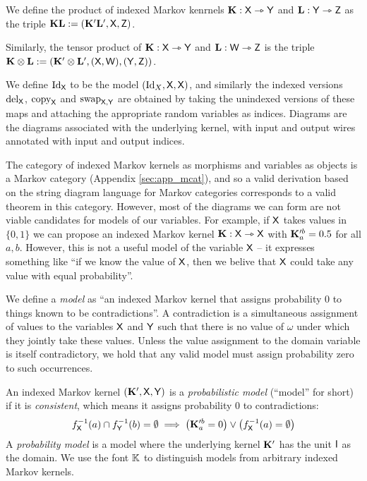 We define the product of indexed Markov kenrnels $\mathbf{K}:\mathsf{X}\rightarrowtriangle \mathsf{Y}$ and $\mathbf{L}:\mathsf{Y}\rightarrowtriangle \mathsf{Z}$ as the triple $\mathbf{K}\mathbf{L}:=(\mathbf{K}'\mathbf{L}',\mathsf{X},\mathsf{Z})$.

Similarly, the tensor product of $\mathbf{K}:\mathsf{X}\rightarrowtriangle\mathsf{Y}$ and $\mathbf{L}:\mathsf{W}\rightarrowtriangle\mathsf{Z}$ is the triple $\mathbf{K}\otimes\mathbf{L}:=(\mathbf{K}'\otimes\mathbf{L}',(\mathsf{X},\mathsf{W}),(\mathsf{Y},\mathsf{Z}))$.

We define $\text{Id}_{\mathsf{X}}$ to be the model $(\text{Id}_X,\mathsf{X},\mathsf{X})$, and similarly the indexed versions $\text{del}_{\mathsf{X}}$, $\text{copy}_{\mathsf{X}}$ and $\text{swap}_{\mathsf{X},\mathsf{Y}}$ are obtained by taking the unindexed versions of these maps and attaching the appropriate random variables as indices. Diagrams are the diagrams associated with the underlying kernel, with input and output wires annotated with input and output indices.

The category of indexed Markov kernels as morphisms and variables as objects is a Markov category (Appendix \ref{sec:app_mcat}), and so a valid derivation based on the string diagram language for Markov categories corresponds to a valid theorem in this category. However, most of the diagrams we can form are not viable candidates for models of our variables. For example, if $\mathsf{X}$ takes values in $\{0,1\}$ we can propose an indexed Markov kernel $\mathbf{K}:\mathsf{X}\rightarrowtriangle\mathsf{X}$ with $\mathbf{K}_a^{\prime b}=0.5$ for all $a, b$. However, this is not a useful model of the variable $\mathsf{X}$ -- it expresses something like ``if we know the value of $\mathsf{X}$, then we belive that $\mathsf{X}$ could take any value with equal probability''.

We define a \emph{model} as ``an indexed Markov kernel that assigns probability 0 to things known to be contradictions''. A contradiction is a simultaneous assignment of values to the variables $\mathsf{X}$ and $\mathsf{Y}$ such that there is no value of $\omega$ under which they jointly take these values. Unless the value assignment to the domain variable is itself contradictory, we hold that any valid model must assign probability zero to such occurrences.

\begin{definition}
An indexed Markov kernel $(\mathbf{K}',\mathsf{X},\mathsf{Y})$ is a \emph{probabilistic model} (``model'' for short) if it is \emph{consistent}, which means it assigns probability 0 to contradictions:
\begin{align}
	f_{\mathsf{X}}^{-1}(a)\cap f_{\mathsf{Y}}^{-1}(b) = \emptyset \implies \left(\mathbf{K}_{a}^{\prime b} = 0\right) \lor \left(f_{\mathsf{X}}^{-1}(a) = \emptyset\right)
\end{align}
A \emph{probability model} is a model where the underlying kernel $\mathbf{K}'$ has the unit $\mathsf{I}$ as the domain. We use the font $\mathbb{K}$ to distinguish models from arbitrary indexed Markov kernels.
\end{definition}

